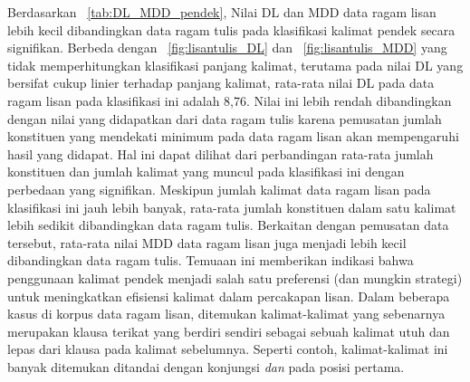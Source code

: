 Berdasarkan \tab~\ref{tab:DL_MDD_pendek}, Nilai DL dan MDD data ragam lisan lebih kecil dibandingkan data ragam tulis pada klasifikasi kalimat pendek secara signifikan. Berbeda dengan \pic~\ref{fig:lisantulis_DL}  dan \pic~\ref{fig:lisantulis_MDD} yang tidak memperhitungkan klasifikasi panjang kalimat, terutama pada nilai DL yang bersifat cukup linier terhadap panjang kalimat, rata-rata nilai DL pada data ragam lisan pada klasifikasi ini adalah 8,76. Nilai ini lebih rendah dibandingkan dengan nilai yang didapatkan dari data ragam tulis karena pemusatan jumlah konstituen yang mendekati minimum pada data ragam lisan akan mempengaruhi hasil yang didapat. Hal ini dapat dilihat dari perbandingan rata-rata jumlah konstituen dan jumlah kalimat yang muncul pada klasifikasi ini dengan perbedaan yang signifikan. Meskipun jumlah kalimat data ragam lisan pada klasifikasi ini jauh lebih banyak, rata-rata jumlah konstituen dalam satu kalimat lebih sedikit dibandingkan data ragam tulis.  Berkaitan dengan pemusatan data tersebut, rata-rata nilai MDD data ragam lisan juga menjadi lebih kecil dibandingkan data ragam tulis. Temuaan ini memberikan indikasi bahwa penggunaan kalimat pendek menjadi salah satu preferensi (dan mungkin strategi)  untuk meningkatkan efisiensi kalimat dalam percakapan lisan. Dalam beberapa kasus di korpus data ragam lisan, ditemukan kalimat-kalimat yang sebenarnya merupakan klausa terikat yang berdiri sendiri sebagai sebuah kalimat utuh dan lepas dari klausa pada kalimat sebelumnya. Seperti contoh, kalimat-kalimat ini banyak ditemukan ditandai dengan konjungsi \textit{dan} pada posisi pertama. 

